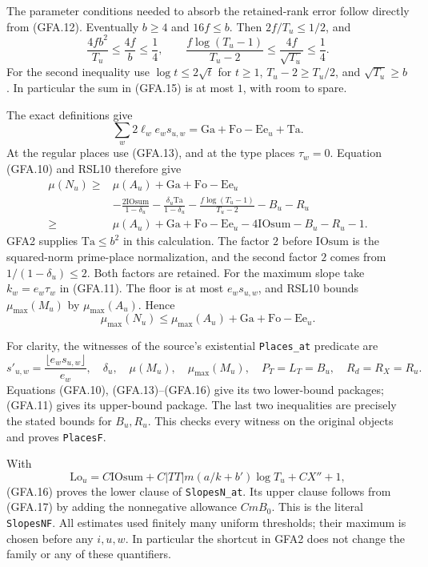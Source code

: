 The parameter conditions needed to absorb the retained-rank error
follow directly from (GFA.12).  Eventually $b\ge4$ and $16f\le b$.
Then $2f/T_u\le1/2$, and
\[
 \frac{4fb^2}{T_u}\le\frac{4f}{b}\le\frac14,
 \qquad
 \frac{f\log(T_u-1)}{T_u-2}
 \le\frac{4f}{\sqrt{T_u}}\le\frac14.                       \tag{GFA.15}
\]
For the second inequality use $\log t\le2\sqrt t$ for $t\ge1$,
$T_u-2\ge T_u/2$, and $\sqrt{T_u}\ge b$.
In particular the sum in (GFA.15) is at most $1$, with room to spare.

The exact definitions give
\[
 \sum_w2\ell_we_ws_{u,w}
       =\mathrm{Ga}+\mathrm{Fo}-\mathrm{Ee}_u+\mathrm{Ta}.
\]
At the regular places use (GFA.13), and at the type places
$\tau_w=0$.  Equation (GFA.10) and RSL10 therefore give
\[
\begin{split}
 \mu(N_u)\ge{}&\mu(A_u)+\mathrm{Ga}+\mathrm{Fo}-\mathrm{Ee}_u\\
 &-\frac{2\mathrm{IOsum}}{1-\delta_u}
   -\frac{\delta_u\mathrm{Ta}}{1-\delta_u}
   -\frac{f\log(T_u-1)}{T_u-2}-B_u-R_u\\
 \ge{}&\mu(A_u)+\mathrm{Ga}+\mathrm{Fo}-\mathrm{Ee}_u
             -4\mathrm{IOsum}-B_u-R_u-1 .
\end{split}                                                    \tag{GFA.16}
\]
GFA2 supplies $\mathrm{Ta}\le b^2$ in this calculation.
The factor $2$ before $\mathrm{IOsum}$ is the squared-norm
prime-place normalization, and the second factor $2$ comes from
$1/(1-\delta_u)\le2$.  Both factors are retained.
For the maximum slope take $k_w=e_w\tau_w$ in (GFA.11).
The floor is at most $e_ws_{u,w}$, and RSL10 bounds
$\mu_{\max}(M_u)$ by $\mu_{\max}(A_u)$.  Hence
\[
 \mu_{\max}(N_u)\le
 \mu_{\max}(A_u)+\mathrm{Ga}+\mathrm{Fo}-\mathrm{Ee}_u.
                                                               \tag{GFA.17}
\]

For clarity, the witnesses of the source's existential
\texttt{Places\_at} predicate are
\[
 s'_{u,w}=\frac{\lfloor e_ws_{u,w}\rfloor}{e_w},\quad
 \delta_u,\quad \mu(M_u),\quad\mu_{\max}(M_u),\quad
 P_T=L_T=B_u,\quad R_d=R_X=R_u.
\]
Equations (GFA.10), (GFA.13)--(GFA.16) give its two lower-bound
packages; (GFA.11) gives its upper-bound package.  The last two
inequalities are precisely the stated bounds for $B_u,R_u$.
This checks every witness on the original objects and proves
\texttt{PlacesF}.

With
\[
 \mathrm{Lo}_u=C\mathrm{IOsum}
    +C|TT|m(a/k+b')\log T_u+CX''+1,
\]
(GFA.16) proves the lower clause of \texttt{SlopesN\_at}.
Its upper clause follows from (GFA.17) by adding the nonnegative
allowance $CmB_0$.  This is the literal \texttt{SlopesNF}.
All estimates used finitely many uniform thresholds; their maximum
is chosen before any $i,u,w$.  In particular the shortcut in GFA2
does not change the family or any of these quantifiers.

